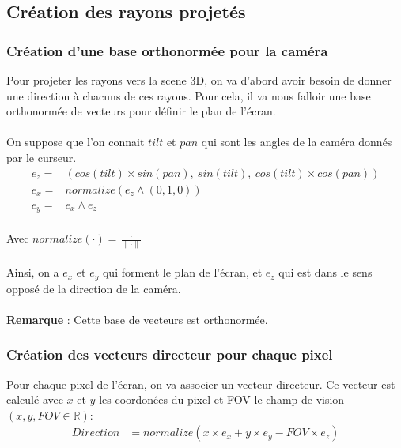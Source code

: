 \newpage
\subsection{Création des rayons projetés}
\subsubsection{Création d'une base orthonormée pour la caméra}
Pour projeter les rayons vers la scene 3D, on va d'abord avoir besoin de donner une direction à chacuns de ces rayons. Pour cela, il va nous falloir une base orthonormée de vecteurs pour définir le plan de l'écran.
\\
\\ 
On suppose que l'on connait $tilt$ et $pan$ qui sont les angles de la caméra donnés par le curseur. 
\begin{align*}
    e_z =&  (cos(tilt)\times sin(pan) ,\ sin(tilt) ,\ cos(tilt)\times cos(pan))\\
    e_x =&  normalize(e_z \wedge (0,1,0) )\\
    e_y =& e_x \wedge e_z\\
\end{align*}

Avec $normalize(\cdot ) = \frac{\cdot }{\| \cdot  \|}$\\ \\  
Ainsi, on a $e_x$ et $e_y$ qui forment le plan de l'écran, et $e_z$ qui est dans le sens opposé de la direction de la caméra.\\ \\ 
\textbf{Remarque} : Cette base de vecteurs est orthonormée.

\subsubsection{Création des vecteurs directeur pour chaque pixel}
Pour chaque pixel de l'écran, on va associer un vecteur directeur. Ce vecteur est calculé avec $x$ et $y$ les coordonées du pixel et FOV le champ de vision $(x,y,FOV\in \mathbb{R})$: 
\begin{align*}
    Direction &= normalize(x\times e_x + y\times e_y - FOV\times e_z)\\
\end{align*}

